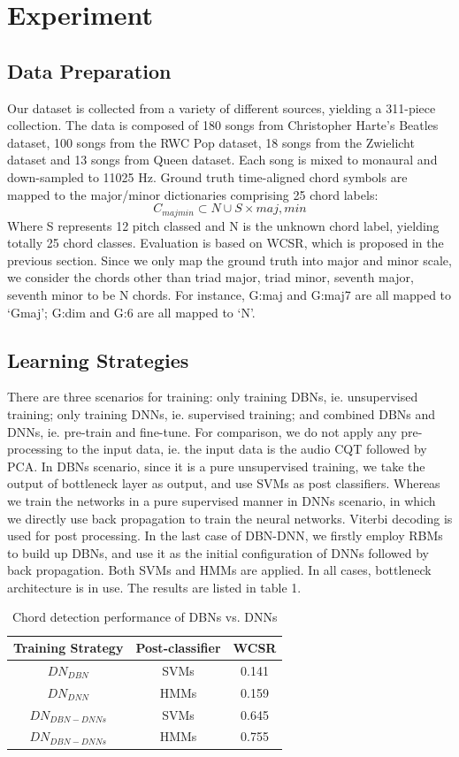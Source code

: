 \documentclass{article}
\begin{document}
\section{Experiment}
\subsection{Data Preparation}
Our dataset is collected from a variety of different sources, yielding a 311-piece collection. The data is composed of 180 songs from Christopher Harte's Beatles dataset, 100 songs from the RWC Pop dataset, 18 songs from the Zwielicht dataset and 13 songs from Queen dataset. Each song is mixed to monaural and down-sampled to 11025 Hz. Ground truth time-aligned chord symbols are mapped to the major/minor dictionaries comprising 25 chord labels:
\begin{equation}
C_{majmin} \subset {N} \cup S \times {maj,min}
\end{equation}
Where S represents 12 pitch classed and N is the unknown chord label, yielding totally 25 chord classes. Evaluation is based on WCSR, which is proposed in the previous section. Since we only map the ground truth into major and minor scale, we consider the chords other than triad major, triad minor, seventh major, seventh minor to be N chords. For instance, G:maj and G:maj7 are all mapped to `Gmaj'; G:dim and G:6 are all mapped to `N'. 
\subsection{Learning Strategies}
There are three scenarios for training: only training DBNs, ie. unsupervised training; only training DNNs, ie. supervised training; and combined DBNs and DNNs, ie. pre-train and fine-tune. For comparison, we do not apply any pre-processing to the input data, ie. the input data is the audio CQT followed by PCA. In DBNs scenario, since it is a pure unsupervised training, we take the output of bottleneck layer as output, and use SVMs as post classifiers. Whereas we train the networks in a pure supervised manner in DNNs scenario, in which we directly use back propagation to train the neural networks. Viterbi decoding is used for post processing. In the last case of DBN-DNN, we firstly employ RBMs to build up DBNs, and use it as the initial configuration of DNNs followed by back propagation. Both SVMs and HMMs are applied. In all cases, bottleneck architecture is in use. The results are listed in table 1. 
\begin{table}[h]
\begin{tabular}{|c|c|c|}
\hline
Training Strategy & Post-classifier & WCSR  \\ \hline
$DN_{DBN}$              & SVMs            & 0.141 \\ \hline
$DN_{DNN}$              & HMMs            & 0.159      \\ \hline
$DN_{DBN-DNNs}$          & SVMs            & 0.645 \\ \hline
$DN_{DBN-DNNs}$          & HMMs            & 0.755 \\ \hline
\end{tabular}
\caption{Chord detection performance of DBNs vs. DNNs}
\end{table}
\end{document}
